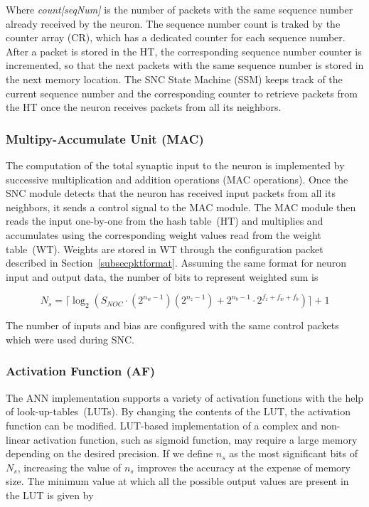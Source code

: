 Where \emph{count[seqNum]} is the number of packets with the same sequence number already received by the neuron.
The sequence number count is traked by the counter array (CR), which has a dedicated counter for each sequence number. 
After a packet is stored in the HT, the corresponding sequence number counter is incremented, so that the next packets with the same sequence number is stored in the next memory location. 
The SNC State Machine (SSM) keeps track of the current sequence number and the corresponding counter to retrieve packets from the HT once the neuron receives packets from all its neighbors. 

\subsubsection{\bf Multipy-Accumulate Unit (MAC)}
The computation of the total synaptic input to the neuron is implemented by successive multiplication and addition operations (MAC operations).
Once the SNC module detects that the neuron has received input packets from all its neighbors, it sends a control signal to the MAC module.
The MAC module then reads the input one-by-one from the hash table~(HT) and multiplies and accumulates using the corresponding weight values read from the weight table~(WT). 
Weights are stored in WT through the configuration packet described in Section~\ref{subsecpktformat}. 
Assuming the same format for neuron input and output data, the number of bits to represent weighted sum is

\begin{equation}
N_{s}=\lceil\log_{2}(S_{NOC}\cdot (2^{n_{w}-1})(2^{n_{z}-1})+2^{n_{b}-1}\cdot 2^{f_{z}+f_{w}+f_{b}})\rceil+1
\label{equation:Ns}
\end{equation}

The number of inputs and bias are configured with the same control packets which were used during SNC.  

\subsubsection{\bf Activation Function (AF)}
The ANN implementation supports a variety of activation functions with the help of look-up-tables~(LUTs).
By changing the contents of the LUT, the activation function can be modified.
LUT-based implementation of a complex and non-linear activation function, such as sigmoid function, may require a large memory depending on the desired precision.  
If we define $n_{s}$ as the most significant bits of $N_{s}$, increasing the value of $n_{s}$ improves the accuracy at the expense of memory size. 
The minimum value at which all the possible output values are present in the LUT is given by

